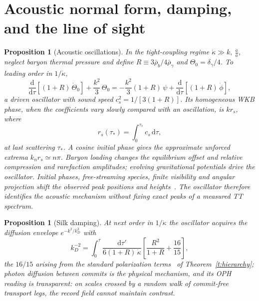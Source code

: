 \documentclass[11pt]{article}
\newtheorem{proposition}[theorem]{Proposition}
\theoremstyle{remark}
\newcommand{\Dd}{\mathrm{d}}
\newcommand{\ah}{\frac{\dot a}{a}}
\newcommand{\kdot}{\dot\kappa}
\begin{document}
\section{Acoustic normal form, damping, and the line of sight}

\begin{proposition}[Acoustic oscillations]\label{p:acoustic}
In the tight-coupling regime $\kdot\gg k,\ \ah$, neglect baryon thermal
pressure and define
$R\equiv 3\bar\rho_b/4\bar\rho_\gamma$ and $\Theta_0=\delta_\gamma/4$. To
leading order in $1/\kdot$,
\[
\frac{\Dd}{\Dd\tau}\!\left[(1+R)\,\dot\Theta_0\right]
+\frac{k^2}{3}\,\Theta_0
=-\frac{k^2}{3}(1+R)\,\psi
+\frac{\Dd}{\Dd\tau}\!\left[(1+R)\,\dot\phi\right],
\]
a driven oscillator with sound speed $c_s^2=1/[3(1+R)]$. Its homogeneous
WKB phase, when the coefficients vary slowly compared with an oscillation,
is $k r_s$, where
\[
r_s(\tau_\ast)=\int_0^{\tau_\ast}\!c_s\,\Dd\tau,
\]
at last scattering $\tau_\ast$. A cosine initial phase gives the approximate
unforced extrema $k_n r_s\simeq n\pi$. Baryon loading changes the
equilibrium offset and relative compression and rarefaction amplitudes;
evolving gravitational potentials drive the oscillator. Initial phases,
free-streaming species, finite visibility and angular projection shift the
observed peak positions and heights~\cite{bashinskyseljak}. The oscillator therefore identifies the
acoustic mechanism without fixing exact peaks of a measured TT spectrum.
\end{proposition}

\begin{proposition}[Silk damping]\label{p:damping}
At next order in $1/\kdot$ the oscillator acquires the diffusion envelope
$e^{-k^2/k_D^2}$ with
\[
k_D^{-2}=\int_0^{\tau}\frac{\Dd\tau'}{6(1+R)\,\kdot}
\left[\frac{R^2}{1+R}+\frac{16}{15}\right],
\]
the $16/15$ arising from the standard polarization terms~\cite{huwhite} of
Theorem~\ref{t:hierarchy}; photon diffusion between commits is the physical
mechanism, and its OPH reading is transparent: on scales crossed by a random
walk of commit-free transport legs, the record field cannot maintain
contrast.
\end{proposition}
\end{document}
